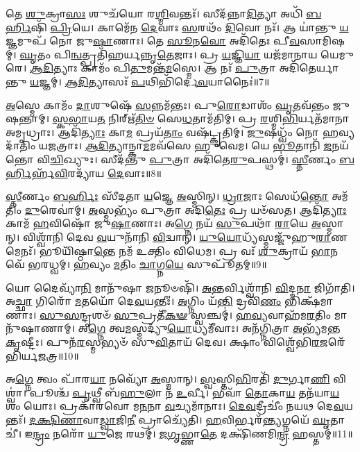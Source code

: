 𑌤𑍇 \ul{𑌶𑍁}\-𑌕𑍍𑌰𑌾\-\ul{𑌸𑌃} 𑌶𑍁𑌚᳴𑌯𑍋 𑌰\-\ul{𑌶𑍍𑌮𑌿}\-𑌵𑌨𑍍𑌤𑌃᳴।
𑌸𑍀𑌦᳴𑌨𑍍𑌨𑌾\-\ul{𑌦𑌿}\-𑌤𑍍𑌯𑌾 𑌅𑌧𑌿᳴ \ul{𑌬}\-\-\ul{𑌰𑍍}\-𑌹𑌿𑌷𑌿᳴ \ul{𑌪𑍍𑌰𑌿}\-𑌯𑍇।
𑌕𑌾𑌮𑍇᳴𑌨 \ul{𑌦𑍇}\-𑌵𑌾𑌃 \ul{𑌸}\-𑌰𑌥𑌂᳴ \ul{𑌦𑌿}\-𑌵𑍋 𑌨𑌃᳴।
𑌆 𑌯𑌾॑𑌨𑍍𑌤𑍁 \ul{𑌯}\-𑌜𑍍𑌞𑌮𑍁𑌪᳴ 𑌨𑍋 𑌜𑍁\-\ul{𑌷𑌾}\-𑌣𑌾𑌃।
𑌤𑍇 \ul{𑌸𑍂}\-𑌨\-\ul{𑌵𑍋} 𑌅𑌦𑌿᳴𑌤𑍇𑌃 𑌪𑍀\-\ul{𑌵}\-𑌸𑌾𑌮𑌿𑌷𑌮𑍍॑।
\-\ul{𑌘𑍃}\-𑌤𑌂 𑌪𑌿\-\ul{𑌨𑍍𑌵}\-𑌤𑍍𑌪𑍍𑌰𑌤𑌿᳴\-𑌹𑌰𑍍𑌯𑌨𑍍𑌨𑍃\-\ul{𑌤𑍇}\-𑌜𑌾𑌃।
𑌪𑍍𑌰 \ul{𑌯}\-𑌜𑍍𑌞𑌿\-\ul{𑌯𑌾} 𑌯𑌜᳴𑌮𑌾𑌨𑌾𑌯 𑌯𑍇𑌮𑍁𑌰𑍇।
\-\ul{𑌆}\-\-\ul{𑌦𑌿}\-𑌤𑍍𑌯𑌾𑌃 𑌕𑌾𑌮𑌂᳴ 𑌪𑌿\-\ul{𑌤𑍁}\-𑌮𑌨𑍍𑌤᳴\-\ul{𑌮}\-𑌸𑍍𑌮𑍇।
𑌆 𑌨𑌃᳴ \ul{𑌪𑍁}\-𑌤𑍍𑌰𑌾 𑌅𑌦𑌿᳴𑌤𑍇𑌰𑍍𑌯𑌾𑌨𑍍𑌤𑍁 \ul{𑌯}\-𑌜𑍍𑌞𑌮𑍍।
\-\ul{𑌆}\-\-\ul{𑌦𑌿}\-𑌤𑍍𑌯𑌾𑌸𑌃᳴ \ul{𑌪}\-𑌥𑌿𑌭𑌿᳴𑌰𑍍𑌦𑍇\-\ul{𑌵}\-𑌯𑌾𑌨𑍈𑌃॑॥7॥

\-\ul{𑌅}\-𑌸𑍍𑌮𑍇 𑌕𑌾𑌮𑌂᳴ \ul{𑌦𑌾}\-𑌶𑍁𑌷𑍇᳴ \ul{𑌸}\-𑌨𑍍𑌨𑌮᳴𑌨𑍍𑌤𑌃।
𑌪𑍁\-\ul{𑌰𑍋}\-𑌡𑌾𑌶𑌂᳴ \ul{𑌘𑍃}\-𑌤𑌵᳴𑌨𑍍𑌤𑌂 𑌜𑍁𑌷𑌨𑍍𑌤𑌾𑌮𑍍।
\-\ul{𑌸𑍍𑌕}\-\-\ul{𑌭𑌾}\-𑌯\-\ul{𑌤} 𑌨𑌿𑌰𑍍\mbox{}𑌋᳴\-\ul{𑌤𑌿}\-\-\ul{𑍞} 𑌸𑍇\-\ul{𑌧}\-𑌤𑌾𑌮᳴𑌤𑌿𑌮𑍍।
𑌪𑍍𑌰 \ul{𑌰}\-𑌶𑍍𑌮𑌿\-\ul{𑌭𑌿}\-𑌰𑍍𑌯𑌤᳴𑌮𑌾𑌨𑌾 𑌅𑌮𑍃𑌧𑍍𑌰𑌾𑌃।
𑌆𑌦𑌿᳴\-\ul{𑌤𑍍𑌯𑌾𑌃} 𑌕𑌾\-\ul{𑌮} 𑌪𑍍𑌰𑌯᳴\-\ul{𑌤𑌾𑌂} 𑌵𑌷᳴𑌟𑍍𑌕𑍃𑌤𑌿𑌮𑍍।
\-\ul{𑌜𑍁}\-𑌷𑌧𑍍𑌵𑌂᳴ 𑌨𑍋 \ul{𑌹}\-𑌵𑍍𑌯𑌦𑌾᳴𑌤𑌿𑌂 𑌯𑌜𑌤𑍍𑌰𑌾𑌃।
\-\ul{𑌆}\-\-\ul{𑌦𑌿}\-𑌤𑍍𑌯𑌾𑌨𑍍𑌕𑌾\-\ul{𑌮}\-𑌮𑌵᳴𑌸𑍇 𑌹𑍁𑌵𑍇𑌮।
𑌯𑍇 \ul{𑌭𑍂}\-𑌤𑌾𑌨𑌿᳴ \ul{𑌜}\-𑌨𑌯᳴𑌨𑍍𑌤𑍋 𑌵𑌿\-\ul{𑌚𑌿}\-𑌖𑍍𑌯𑍁𑌃।
𑌸𑍀𑌦᳴𑌨𑍍𑌤𑍁 \ul{𑌪𑍁}\-𑌤𑍍𑌰𑌾 𑌅𑌦𑌿᳴𑌤𑍇\-\ul{𑌰𑍁}\-𑌪𑌸𑍍𑌥𑌮𑍍॑।
\-\ul{𑌸𑍍𑌤𑍀}\-𑌰𑍍𑌣𑌂 \ul{𑌬}\-\-\ul{𑌰𑍍}\-𑌹𑌿𑌰𑍍\mbox{}𑌹᳴\-\ul{𑌵𑌿}\-𑌰𑌦𑍍𑌯𑌾᳴𑌯 \ul{𑌦𑍇}\-𑌵𑌾𑌃॥8॥

\-\ul{𑌸𑍍𑌤𑍀}\-𑌰𑍍𑌣𑌂 \ul{𑌬}\-\-\ul{𑌰𑍍}\-𑌹𑌿𑌃 𑌸𑍀᳴𑌦𑌤𑌾 \ul{𑌯}\-𑌜𑍍𑌞𑍇 \ul{𑌅}\-𑌸𑍍𑌮𑌿𑌨𑍍।
\-\ul{𑌧𑍍𑌰𑌾}\-𑌜𑌾𑌃 𑌸𑍇𑌧᳴\-\ul{𑌨𑍍𑌤𑍋} 𑌅𑌮᳴𑌤𑌿𑌂 \ul{𑌦𑍁}\-𑌰𑍇𑌵𑌾॑𑌮𑍍।
\-\ul{𑌅}\-𑌸𑍍𑌮𑌭𑍍𑌯𑌂᳴ 𑌪𑍁𑌤𑍍𑌰𑌾 𑌅𑌦𑌿\-\ul{𑌤𑍇𑌃} 𑌪𑍍𑌰 𑌯𑍞᳴𑌸𑌤।
𑌆𑌦𑌿᳴\-\ul{𑌤𑍍𑌯𑌾𑌃} 𑌕𑌾𑌮᳴ \ul{𑌹}\-𑌵𑌿𑌷𑍋᳴ 𑌜𑍁\-\ul{𑌷𑌾}\-𑌣𑌾𑌃।
𑌅\-\ul{𑌗𑍍𑌨𑍇} 𑌨𑌯᳴ \ul{𑌸𑍁}\-𑌪𑌥𑌾᳴ \ul{𑌰𑌾}\-𑌯𑍇 \ul{𑌅}\-𑌸𑍍𑌮𑌾𑌨𑍍।
𑌵𑌿𑌶𑍍𑌵𑌾᳴𑌨𑌿 𑌦𑍇𑌵 \ul{𑌵}\-𑌯𑍁𑌨𑌾᳴𑌨𑌿 \ul{𑌵𑌿}\-𑌦𑍍𑌵𑌾𑌨𑍍।
\-\ul{𑌯𑍁}\-\-\ul{𑌯𑍋}\-𑌧𑍍𑌯᳴𑌸𑍍𑌮𑌜𑍍𑌜𑍁᳴𑌹𑍁\-\ul{𑌰𑌾}\-𑌣𑌮𑍇𑌨𑌃᳴।
𑌭𑍂𑌯𑌿᳴𑌷𑍍𑌠𑌾\-\ul{𑌨𑍍𑌤𑍇} 𑌨𑌮᳴ 𑌉𑌕𑍍𑌤𑌿𑌂 𑌵𑌿𑌧𑍇𑌮।
𑌪𑍍𑌰 𑌵𑌃᳴ \ul{𑌶𑍁}\-𑌕𑍍𑌰𑌾𑌯᳴ \ul{𑌭𑌾}\-𑌨𑌵𑍇᳴ 𑌭𑌰𑌧𑍍𑌵𑌮𑍍।
\-\ul{𑌹}\-𑌵𑍍𑌯𑌂 \ul{𑌮}\-𑌤𑌿𑌂 \ul{𑌚𑌾}\-𑌗𑍍𑌨\-\ul{𑌯𑍇} 𑌸𑍁𑌪𑍂᳴𑌤𑌮𑍍॥9॥

𑌯𑍋 𑌦𑍈𑌵𑍍𑌯𑌾᳴\-\ul{𑌨𑌿} 𑌮𑌾𑌨𑍁᳴𑌷𑌾 \ul{𑌜}\-𑌨𑍂𑍞𑌷𑌿᳴।
\-\ul{𑌅}\-𑌨𑍍𑌤𑌰𑍍𑌵𑌿𑌶𑍍𑌵𑌾᳴𑌨𑌿 \ul{𑌵𑌿}\-𑌦𑍍𑌮\-\ul{𑌨𑌾} 𑌜𑌿𑌗𑌾᳴𑌤𑌿।
𑌅\-\ul{𑌚𑍍𑌛𑌾} 𑌗𑌿𑌰𑍋᳴ \ul{𑌮}\-𑌤𑌯𑍋᳴ 𑌦𑍇\-\ul{𑌵}\-𑌯𑌨𑍍𑌤𑍀𑌃॑।
\-\ul{𑌅}\-𑌗𑍍𑌨𑌿𑌂 𑌯᳴\-\ul{𑌨𑍍𑌤𑌿} 𑌦𑍍𑌰𑌵𑌿᳴\-\ul{𑌣𑌂} 𑌭𑌿𑌕𑍍𑌷᳴𑌮𑌾𑌣𑌾𑌃।
\-\ul{𑌸𑍁}\-\-\ul{𑌸}\-𑌨𑍍𑌦𑍃𑌶𑍞᳴ \ul{𑌸𑍁}\-𑌪𑍍𑌰𑌤𑍀᳴\-\ul{𑌕}\-\-\ul{𑍟} 𑌸𑍍𑌵𑌞𑍍𑌚𑌮𑍍॑।
\-\ul{𑌹}\-\-\ul{𑌵𑍍𑌯}\-𑌵𑌾𑌹᳴𑌮\-\ul{𑌰}\-𑌤𑌿𑌂 𑌮𑌾𑌨𑍁᳴𑌷𑌾𑌣𑌾𑌮𑍍।
𑌅\-\ul{𑌗𑍍𑌨𑍇} 𑌤𑍍𑌵\-\ul{𑌮}\-𑌸𑍍𑌮𑌦𑍍𑌯𑍁᳴\-\ul{𑌯𑍋}\-𑌧𑍍𑌯𑌮𑍀᳴𑌵𑌾𑌃।
𑌅𑌨᳴𑌗𑍍𑌨𑌿𑌤𑍍𑌰𑌾 \ul{𑌅}\-𑌭𑍍𑌯᳴𑌮𑌨𑍍𑌤 \ul{𑌕𑍃}\-𑌷𑍍𑌟𑍀𑌃।
𑌪𑍁𑌨᳴\-\ul{𑌰}\-𑌸𑍍𑌮𑌭𑍍𑌯𑍞᳴ 𑌸𑍁\-\ul{𑌵𑌿}\-𑌤𑌾𑌯᳴ 𑌦𑍇𑌵।
𑌕𑍍𑌷𑌾𑌂 𑌵𑌿𑌶𑍍𑌵𑍇᳴𑌭𑌿\-\ul{𑌰}\-𑌜𑌰𑍇᳴𑌭𑌿𑌰𑍍𑌯𑌜𑌤𑍍𑌰॥10॥

𑌅\-\ul{𑌗𑍍𑌨𑍇} 𑌤𑍍𑌵𑌂 𑌪𑌾᳴𑌰\-\ul{𑌯𑌾} 𑌨𑌵𑍍𑌯𑍋᳴ \ul{𑌅}\-𑌸𑍍𑌮𑌾𑌨𑍍।
\-\ul{𑌸𑍍𑌵}\-𑌸𑍍𑌤𑌿\-\ul{𑌭𑌿}\-𑌰𑌤𑌿᳴ \ul{𑌦𑍁}\-𑌰𑍍𑌗𑌾\-\ul{𑌣𑌿} 𑌵𑌿𑌶𑍍𑌵𑌾॑।
𑌪𑍂𑌶𑍍𑌚᳴ \ul{𑌪𑍃}\-𑌥𑍍𑌵𑍀 𑌬᳴\-\ul{𑌹𑍁}\-𑌲𑌾 𑌨᳴ \ul{𑌉}\-𑌰𑍍𑌵𑍀।
𑌭𑌵𑌾᳴ \ul{𑌤𑍋}\-𑌕𑌾\-\ul{𑌯} 𑌤𑌨᳴𑌯𑌾\-\ul{𑌯} 𑌶𑌂 𑌯𑍋𑌃।
𑌪𑍍𑌰𑌕𑌾᳴𑌰𑌵𑍋 𑌮\-\ul{𑌨}\-𑌨𑌾 \ul{𑌵}\-𑌚𑍍𑌯𑌮𑌾᳴𑌨𑌾𑌃।
\-\ul{𑌦𑍇}\-\-\ul{𑌵}\-𑌦𑍍𑌰𑍀𑌚𑍀𑌂॑ 𑌨𑌯𑌥 𑌦𑍇\-\ul{𑌵}\-𑌯𑌨𑍍𑌤𑌃᳴।
\-\ul{𑌦}\-\-\ul{𑌕𑍍𑌷𑌿}\-\-\ul{𑌣𑌾}\-𑌵𑌾\-\ul{𑌡𑍍𑌵𑌾}\-𑌜𑌿\-\ul{𑌨𑍀} 𑌪𑍍𑌰𑌾𑌚𑍍𑌯𑍇᳴𑌤𑌿।
\-\ul{𑌹}\-𑌵𑌿𑌰𑍍𑌭𑌰᳴\-\ul{𑌨𑍍𑌤𑍍𑌯}\-𑌗𑍍𑌨𑌯𑍇᳴ \ul{𑌘𑍃}\-𑌤𑌾𑌚𑍀॑।
𑌇\-\ul{𑌨𑍍𑌦𑍍𑌰𑌂} 𑌨𑌰𑍋᳴ \ul{𑌯𑍁}\-𑌜𑍇 𑌰𑌥𑌮𑍍॑।
\-\ul{𑌜}\-\-\ul{𑌗𑍃}\-𑌭𑍍𑌣𑌾\-\ul{𑌤𑍇} 𑌦𑌕𑍍𑌷𑌿᳴𑌣𑌮𑌿\-\ul{𑌨𑍍𑌦𑍍𑌰} 𑌹𑌸𑍍𑌤𑌮𑍍॑॥11॥

